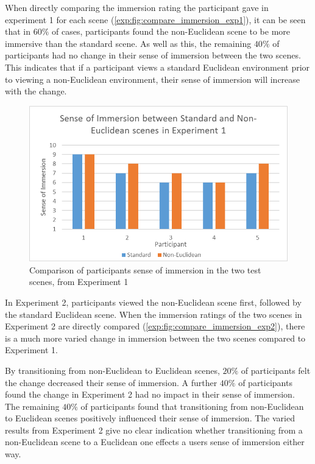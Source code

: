 			When directly comparing the immersion rating the participant gave in experiment 1 for each scene (\autoref{exp:fig:compare_immersion_exp1}), it can be seen that in $60\%$ of cases, participants found the non-Euclidean scene to be more immersive than the standard scene.
			As well as this, the remaining $40\%$ of participants had no change in their sense of immersion between the two scenes.
			This indicates that if a participant views a standard Euclidean environment prior to viewing a non-Euclidean environment, their sense of immersion will increase with the change.

			\begin{figure}[H]
				\includegraphics[width=1\textwidth]{Images/Compare_Immersion_Exp_1}
				\centering
				\caption{Comparison of participants sense of immersion in the two test scenes, from Experiment 1}
				\label{exp:fig:compare_immersion_exp1}
			\end{figure}

			In Experiment 2, participants viewed the non-Euclidean scene first, followed by the standard Euclidean scene.
			When the immersion ratings of the two scenes in Experiment 2 are directly compared (\autoref{exp:fig:compare_immersion_exp2}), there is a much more varied change in immersion between the two scenes compared to Experiment 1.

			By transitioning from non-Euclidean to Euclidean scenes, $20\%$ of participants felt the change decreased their sense of immersion.
			A further $40\%$ of participants found the change in Experiment 2 had no impact in their sense of immersion.
			The remaining $40\%$ of participants found that transitioning from non-Euclidean to Euclidean scenes positively influenced their sense of immersion.
			The varied results from Experiment 2 give no clear indication whether transitioning from a non-Euclidean scene to a Euclidean one effects a users sense of immersion either way.

